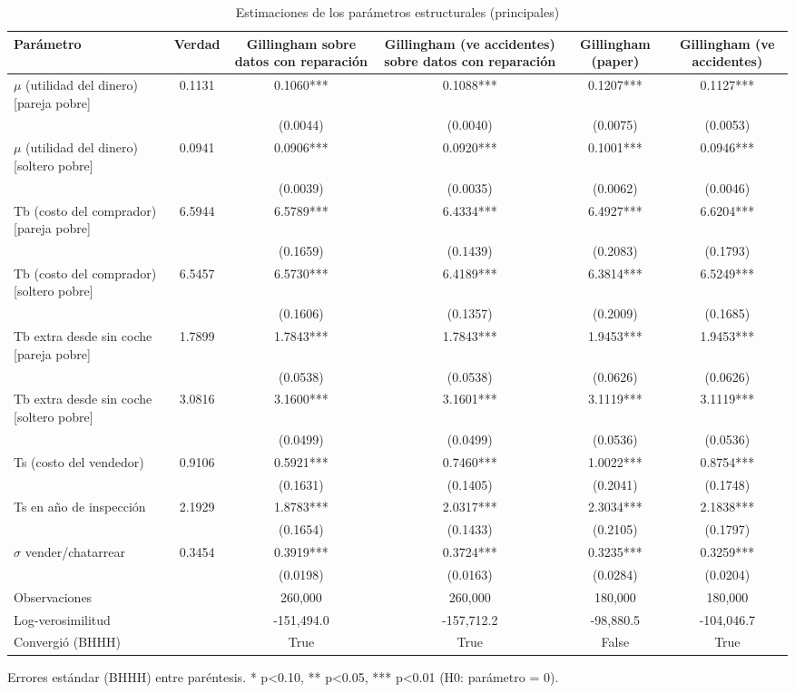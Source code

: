 \begin{table}[htbp]
\centering
\caption{Estimaciones de los parámetros estructurales (principales)}
\begin{tabular}{lccccc}
\toprule
Parámetro & Verdad & Gillingham sobre datos con reparación & Gillingham (ve accidentes) sobre datos con reparación & Gillingham (paper) & Gillingham (ve accidentes) \\
\midrule
$\mu$ (utilidad del dinero) [pareja pobre] & 0.1131 & 0.1060*** & 0.1088*** & 0.1207*** & 0.1127*** \\
 &  & (0.0044) & (0.0040) & (0.0075) & (0.0053) \\
$\mu$ (utilidad del dinero) [soltero pobre] & 0.0941 & 0.0906*** & 0.0920*** & 0.1001*** & 0.0946*** \\
 &  & (0.0039) & (0.0035) & (0.0062) & (0.0046) \\
Tb (costo del comprador) [pareja pobre] & 6.5944 & 6.5789*** & 6.4334*** & 6.4927*** & 6.6204*** \\
 &  & (0.1659) & (0.1439) & (0.2083) & (0.1793) \\
Tb (costo del comprador) [soltero pobre] & 6.5457 & 6.5730*** & 6.4189*** & 6.3814*** & 6.5249*** \\
 &  & (0.1606) & (0.1357) & (0.2009) & (0.1685) \\
Tb extra desde sin coche [pareja pobre] & 1.7899 & 1.7843*** & 1.7843*** & 1.9453*** & 1.9453*** \\
 &  & (0.0538) & (0.0538) & (0.0626) & (0.0626) \\
Tb extra desde sin coche [soltero pobre] & 3.0816 & 3.1600*** & 3.1601*** & 3.1119*** & 3.1119*** \\
 &  & (0.0499) & (0.0499) & (0.0536) & (0.0536) \\
Ts (costo del vendedor) & 0.9106 & 0.5921*** & 0.7460*** & 1.0022*** & 0.8754*** \\
 &  & (0.1631) & (0.1405) & (0.2041) & (0.1748) \\
Ts en año de inspección & 2.1929 & 1.8783*** & 2.0317*** & 2.3034*** & 2.1838*** \\
 &  & (0.1654) & (0.1433) & (0.2105) & (0.1797) \\
$\sigma$ vender/chatarrear & 0.3454 & 0.3919*** & 0.3724*** & 0.3235*** & 0.3259*** \\
 &  & (0.0198) & (0.0163) & (0.0284) & (0.0204) \\
Observaciones &  & 260,000 & 260,000 & 180,000 & 180,000 \\
Log-verosimilitud &  & -151,494.0 & -157,712.2 & -98,880.5 & -104,046.7 \\
Convergió (BHHH) &  & True & True & False & True \\
\bottomrule
\end{tabular}
\par\smallskip\footnotesize Errores estándar (BHHH) entre paréntesis. * p<0.10, ** p<0.05, *** p<0.01 (H0: parámetro = 0).
\end{table}
